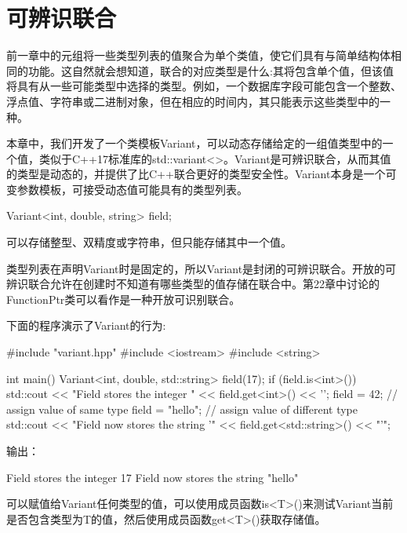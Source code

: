 \chapter{可辨识联合}
前一章中的元组将一些类型列表的值聚合为单个类值，使它们具有与简单结构体相同的功能。这自然就会想知道，联合的对应类型是什么:其将包含单个值，但该值将具有从一些可能类型中选择的类型。例如，一个数据库字段可能包含一个整数、浮点值、字符串或二进制对象，但在相应的时间内，其只能表示这些类型中的一种。

本章中，我们开发了一个类模板Variant，可以动态存储给定的一组值类型中的一个值，类似于C++17标准库的std::variant<>。Variant是可辨识联合，从而其值的类型是动态的，并提供了比C++联合更好的类型安全性。Variant本身是一个可变参数模板，可接受动态值可能具有的类型列表。

\begin{cpp}
Variant<int, double, string> field;
\end{cpp}

可以存储整型、双精度或字符串，但只能存储其中一个值。

\begin{notice}
类型列表在声明Variant时是固定的，所以Variant是封闭的可辨识联合。开放的可辨识联合允许在创建时不知道有哪些类型的值存储在联合中。第22章中讨论的FunctionPtr类可以看作是一种开放可识别联合。
\end{notice}

下面的程序演示了Variant的行为:

\begin{cpp}
#include "variant.hpp"
#include <iostream>
#include <string>
 
int main()
{
	Variant<int, double, std::string> field(17);
	if (field.is<int>()) {
		std::cout << "Field stores the integer "
				<< field.get<int>() << ’\n’;
	}
	field = 42; // assign value of same type
	field = "hello"; // assign value of different type
	std::cout << "Field now stores the string ’"
			<< field.get<std::string>() << "’\n";
}
\end{cpp}

输出：

\begin{shell}
Field stores the integer 17
Field now stores the string "hello"
\end{shell}

可以赋值给Variant任何类型的值，可以使用成员函数is<T>()来测试Variant当前是否包含类型为T的值，然后使用成员函数get<T>()获取存储值。






































